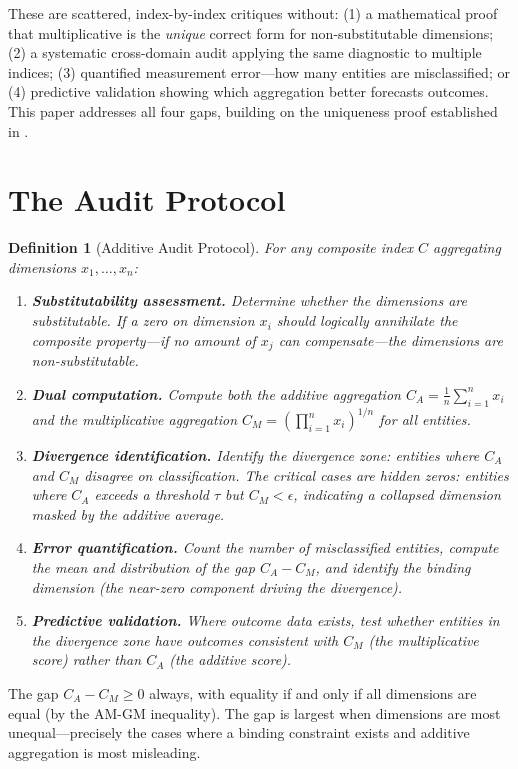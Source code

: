 \documentclass[12pt]{article}
\newtheorem{definition}{Definition}
\begin{document}
These are scattered, index-by-index critiques without: (1) a mathematical proof that multiplicative is the \emph{unique} correct form for non-substitutable dimensions; (2) a systematic cross-domain audit applying the same diagnostic to multiple indices; (3) quantified measurement error---how many entities are misclassified; or (4) predictive validation showing which aggregation better forecasts outcomes. This paper addresses all four gaps, building on the uniqueness proof established in \citet{kirsch2026mc}.


\section{The Audit Protocol}

\begin{definition}[Additive Audit Protocol]
For any composite index $C$ aggregating dimensions $x_1, \ldots, x_n$:
\begin{enumerate}
\item \textbf{Substitutability assessment.} Determine whether the dimensions are substitutable. If a zero on dimension $x_i$ should logically annihilate the composite property---if no amount of $x_j$ can compensate---the dimensions are non-substitutable.
\item \textbf{Dual computation.} Compute both the additive aggregation $C_A = \frac{1}{n}\sum_{i=1}^n x_i$ and the multiplicative aggregation $C_M = \left(\prod_{i=1}^n x_i\right)^{1/n}$ for all entities.
\item \textbf{Divergence identification.} Identify the \emph{divergence zone}: entities where $C_A$ and $C_M$ disagree on classification. The critical cases are \emph{hidden zeros}: entities where $C_A$ exceeds a threshold $\tau$ but $C_M < \epsilon$, indicating a collapsed dimension masked by the additive average.
\item \textbf{Error quantification.} Count the number of misclassified entities, compute the mean and distribution of the gap $C_A - C_M$, and identify the binding dimension (the near-zero component driving the divergence).
\item \textbf{Predictive validation.} Where outcome data exists, test whether entities in the divergence zone have outcomes consistent with $C_M$ (the multiplicative score) rather than $C_A$ (the additive score).
\end{enumerate}
\end{definition}

The gap $C_A - C_M \geq 0$ always, with equality if and only if all dimensions are equal (by the AM-GM inequality). The gap is largest when dimensions are most unequal---precisely the cases where a binding constraint exists and additive aggregation is most misleading.
\end{document}
